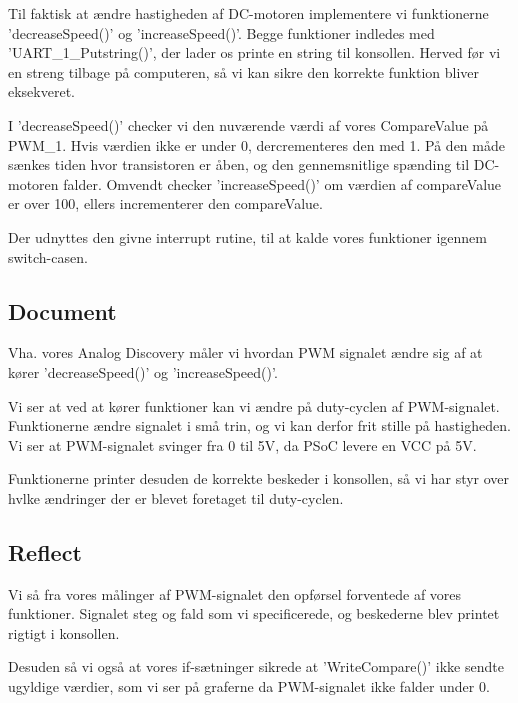 \documentclass[../main.tex]{subfiles}
\begin{document}
Til faktisk at ændre hastigheden af DC-motoren implementere vi funktionerne ’decreaseSpeed()’ og ’increaseSpeed()’. Begge funktioner indledes med ’UART\_1\_Putstring()’, der lader os printe en string til konsollen. Herved før vi en streng tilbage på computeren, så vi kan sikre den korrekte funktion bliver eksekveret.


I ’decreaseSpeed()’ checker vi den nuværende værdi af vores CompareValue på PWM\_1. Hvis værdien ikke er under 0, dercrementeres den med 1. På den måde sænkes tiden hvor transistoren er åben, og den gennemsnitlige spænding til DC-motoren falder. Omvendt checker 'increaseSpeed()' om værdien af compareValue er over 100, ellers incrementerer den compareValue.

Der udnyttes den givne interrupt rutine, til at kalde vores funktioner igennem switch-casen.

\subsection{Document}
Vha. vores Analog Discovery måler vi hvordan PWM signalet ændre sig af at kører ’decreaseSpeed()’ og ’increaseSpeed()’.


Vi ser at ved at kører funktioner kan vi ændre på duty-cyclen af PWM-signalet. Funktionerne ændre signalet i små trin, og vi kan derfor frit stille på hastigheden. Vi ser at PWM-signalet svinger fra 0 til 5V, da PSoC levere en VCC på 5V.

Funktionerne printer desuden de korrekte beskeder i konsollen, så vi har styr over hvlke ændringer der er blevet foretaget til duty-cyclen.

\subsection{Reflect}    
Vi så fra vores målinger af PWM-signalet den opførsel forventede af vores funktioner. Signalet steg og fald som vi specificerede, og beskederne blev printet rigtigt i konsollen.

Desuden så vi også at vores if-sætninger sikrede at ’WriteCompare()’ ikke sendte ugyldige værdier, som vi ser på graferne da PWM-signalet ikke falder under 0.
\end{document}
